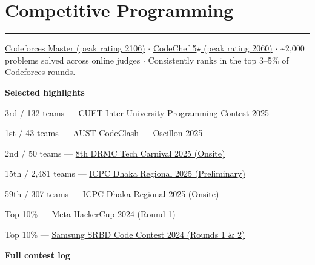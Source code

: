 \documentclass[10pt]{article}
\newcommand{\sectionrule}{\vspace{-2pt}\noindent\textcolor{rulegray}{\rule{\linewidth}{1pt}}\vspace{6pt}}
\newcommand{\cvsection}[1]{%
  \Needspace{6\baselineskip}%
  \section{#1}\sectionrule%
}
\begin{document}
\cvsection{Competitive Programming}

\href{https://codeforces.com/profile/ThisWasUnplanned}{Codeforces Master (peak rating 2106)} $\cdot$ \href{https://www.codechef.com/users/zunaid13}{CodeChef 5$\star$ (peak rating 2060)} $\cdot$ \textasciitilde2,000 problems solved across online judges $\cdot$ Consistently ranks in the top 3--5\% of Codeforces rounds.

\textbf{Selected highlights}
\begin{cvitemize}
  \item 3rd / 132 teams --- \href{https://toph.co/c/cuet-iupc-2025/standings}{CUET Inter-University Programming Contest 2025}
  \item 1st / 43 teams --- \href{https://toph.co/c/codeclash-oscillon-2025/standings}{AUST CodeClash --- Oscillon 2025}
  \item 2nd / 50 teams --- \href{https://toph.co/c/preliminary-8th-drmc-intl-tech-carnival-2025/standings}{8th DRMC Tech Carnival 2025 (Onsite)}
  \item 15th / 2{,}481 teams --- \href{https://icpc.global/regionals/finder/Dhaka-Preliminary-2024/standings}{ICPC Dhaka Regional 2025 (Preliminary)}
  \item 59th / 307 teams --- \href{https://icpc.global/regionals/finder/Dhaka-2025/standings}{ICPC Dhaka Regional 2025 (Onsite)}
  \item Top 10\% --- \href{https://www.facebook.com/codingcompetitions/hacker-cup/2024/certificate/1519485338929641}{Meta HackerCup 2024 (Round 1)}
  \item Top 10\% --- \href{https://www.hackerrank.com/contests/srbd-code-contest-2024-round-1/leaderboard}{Samsung SRBD Code Contest 2024 (Rounds 1 \& 2)}
\end{cvitemize}

\vspace{4pt}
\textbf{Full contest log}
\vspace{2pt}
\end{document}
